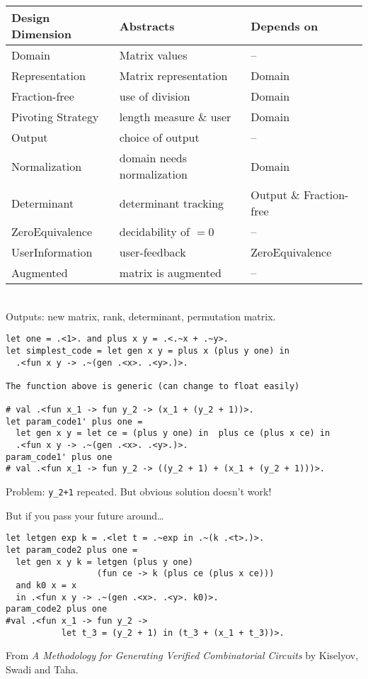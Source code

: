 \documentclass[landscape]{slides}
\begin{document}
\begin{slide}
    \hspace*{-2cm}
        \begin{tabular}{|l|l|l|} \hline
        Design Dimension & Abstracts & Depends on \\ \hline
        Domain & Matrix values & -- \\ \hline
        Representation & Matrix representation & Domain \\ \hline
        Fraction-free & use of division & Domain \\ \hline
        Pivoting Strategy & length measure \& user & Domain \\ \hline
        Output & choice of output & -- \\ \hline
        Normalization & domain needs normalization & Domain \\ \hline
        Determinant & determinant tracking & Output \& Fraction-free \\ \hline
        ZeroEquivalence & decidability of $=0$ & -- \\ \hline
        UserInformation & user-feedback & ZeroEquivalence\\ \hline
        Augmented & matrix is augmented & -- \\ \hline
    \end{tabular}\\
\vspace{5mm}
Outputs: new matrix, rank, determinant, permutation matrix.
\end{slide}

\begin{slide}
\begin{verbatim}
let one = .<1>. and plus x y = .<.~x + .~y>.
let simplest_code = let gen x y = plus x (plus y one) in
  .<fun x y -> .~(gen .<x>. .<y>.)>.

The function above is generic (can change to float easily)

# val .<fun x_1 -> fun y_2 -> (x_1 + (y_2 + 1))>.
let param_code1' plus one =
  let gen x y = let ce = (plus y one) in  plus ce (plus x ce) in
  .<fun x y -> .~(gen .<x>. .<y>.)>.
param_code1' plus one
# val .<fun x_1 -> fun y_2 -> ((y_2 + 1) + (x_1 + (y_2 + 1)))>.
\end{verbatim}
Problem: \verb=y_2+1= repeated.  But obvious solution doesn't work!
\end{slide}

\begin{slide}
    But if you pass your future around\dots
\begin{verbatim}
let letgen exp k = .<let t = .~exp in .~(k .<t>.)>.
let param_code2 plus one =
  let gen x y k = letgen (plus y one) 
                  (fun ce -> k (plus ce (plus x ce)))
  and k0 x = x
  in .<fun x y -> .~(gen .<x>. .<y>. k0)>.
param_code2 plus one
#val .<fun x_1 -> fun y_2 -> 
           let t_3 = (y_2 + 1) in (t_3 + (x_1 + t_3))>.
\end{verbatim}
From \textit{A Methodology for Generating Verified Combinatorial Circuits} by 
Kiselyov, Swadi and Taha.
\end{slide}
\end{document}
